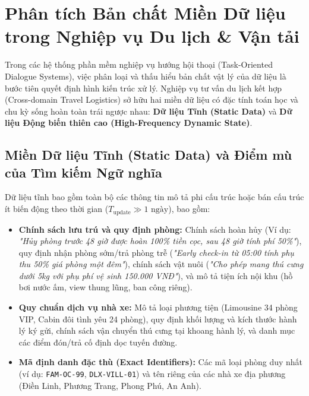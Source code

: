 \section{Phân tích Bản chất Miền Dữ liệu trong Nghiệp vụ Du lịch \& Vận tải}
\label{sec:phan_tich_mien_du_lieu}

Trong các hệ thống phần mềm nghiệp vụ hướng hội thoại (Task-Oriented Dialogue Systems), việc phân loại và thấu hiểu bản chất vật lý của dữ liệu là bước tiên quyết định hình kiến trúc xử lý. Nghiệp vụ tư vấn du lịch kết hợp (Cross-domain Travel Logistics) sở hữu hai miền dữ liệu có đặc tính toán học và chu kỳ sống hoàn toàn trái ngược nhau: \textbf{Dữ liệu Tĩnh (Static Data)} và \textbf{Dữ liệu Động biến thiên cao (High-Frequency Dynamic State)}.

\subsection{Miền Dữ liệu Tĩnh (Static Data) và Điểm mù của Tìm kiếm Ngữ nghĩa}
\label{subsec:static_data}

Dữ liệu tĩnh bao gồm toàn bộ các thông tin mô tả phi cấu trúc hoặc bán cấu trúc ít biến động theo thời gian ($T_{\text{update}} \gg 1\text{ ngày}$), bao gồm:
\begin{itemize}
    \item \textbf{Chính sách lưu trú và quy định phòng:} Chính sách hoàn hủy (Ví dụ: \textit{"Hủy phòng trước 48 giờ được hoàn 100\% tiền cọc, sau 48 giờ tính phí 50\%"}), quy định nhận phòng sớm/trả phòng trễ (\textit{"Early check-in từ 05:00 tính phụ thu 50\% giá phòng một đêm"}), chính sách vật nuôi (\textit{"Cho phép mang thú cưng dưới 5kg với phụ phí vệ sinh 150.000 VNĐ"}), và mô tả tiện ích nội khu (hồ bơi nước ấm, view thung lũng, ban công riêng).
    \item \textbf{Quy chuẩn dịch vụ nhà xe:} Mô tả loại phương tiện (Limousine 34 phòng VIP, Cabin đôi tình yêu 24 phòng), quy định khối lượng và kích thước hành lý ký gửi, chính sách vận chuyển thú cưng tại khoang hành lý, và danh mục các điểm đón/trả cố định dọc tuyến đường.
    \item \textbf{Mã định danh đặc thù (Exact Identifiers):} Các mã loại phòng duy nhất (ví dụ: \texttt{FAM-OC-99}, \texttt{DLX-VILL-01}) và tên riêng của các nhà xe địa phương (Điền Linh, Phương Trang, Phong Phú, An Anh).
\end{itemize}

